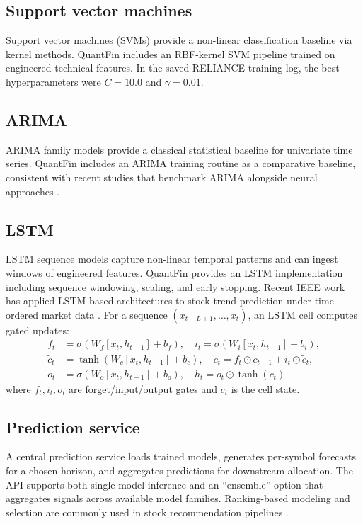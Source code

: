 \documentclass[conference]{IEEEtran}
\begin{document}
\subsection{Support vector machines}
Support vector machines (SVMs) provide a non-linear classification baseline via kernel methods. QuantFin includes an RBF-kernel SVM pipeline trained on engineered technical features. In the saved RELIANCE training log, the best hyperparameters were $C=10.0$ and $\gamma=0.01$.

\subsection{ARIMA}
ARIMA family models provide a classical statistical baseline for univariate time series. QuantFin includes an ARIMA training routine as a comparative baseline, consistent with recent studies that benchmark ARIMA alongside neural approaches \cite{gao2021arimadeep}.

\subsection{LSTM}
LSTM sequence models capture non-linear temporal patterns and can ingest windows of engineered features. QuantFin provides an LSTM implementation including sequence windowing, scaling, and early stopping. Recent IEEE work has applied LSTM-based architectures to stock trend prediction under time-ordered market data \cite{karlis2021lstmfusion}. For a sequence $(x_{t-L+1},\dots,x_t)$, an LSTM cell computes gated updates:
\begin{align}
f_t &= \sigma(W_f[x_t,h_{t-1}] + b_f),\quad i_t = \sigma(W_i[x_t,h_{t-1}] + b_i),\\
\tilde{c}_t &= \tanh(W_c[x_t,h_{t-1}] + b_c),\quad c_t = f_t\odot c_{t-1} + i_t\odot \tilde{c}_t,\\
o_t &= \sigma(W_o[x_t,h_{t-1}] + b_o),\quad h_t = o_t\odot \tanh(c_t)
\end{align}
where $f_t,i_t,o_t$ are forget/input/output gates and $c_t$ is the cell state.

\subsection{Prediction service}
A central prediction service loads trained models, generates per-symbol forecasts for a chosen horizon, and aggregates predictions for downstream allocation. The API supports both single-model inference and an ``ensemble'' option that aggregates signals across available model families. Ranking-based modeling and selection are commonly used in stock recommendation pipelines \cite{saha2021stockranking}.
\end{document}
